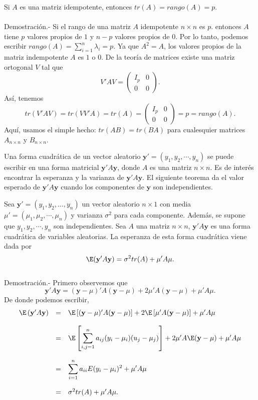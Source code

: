 \begin{teo}
    Si $A$ es una matriz idempotente, entonces $tr(A)=rango(A)=p.$\\\\
	Demostración.-\; Si el rango de una matriz $A$ idempotente $n\times n$ es $p$. entonces $A$ tiene $p$ valores propios de $1$ y $n-p$ valores propios de $0$. Por lo tanto, podemos escribir $rango(A)=\sum_{i=1}^n\lambda_i=p$. Ya que $A^2=A$, los valores propios de la matriz indempotente $A$ es $1$ o $0$. De la teoría de matrices existe una matriz ortogonal $V$ tal que
	$$
	V' A V=
	\left(
	    \begin{array}{cc}
		I_p & 0 \\
		0 & 0
	    \end{array}
	\right).
	$$
	Así, tenemos
	$$tr(V'AV)=tr(VV'A)=tr(A)= 
	\left(
	    \begin{array}{cc}
		I_p & 0 \\
		0 & 0
	    \end{array}
	\right)
	=p=rango(A).
	$$
	Aquí, usamos el simple hecho: $tr(AB)=tr(BA)$ para cualesquier matrices $A_{n\times n}$ y $B_{n\times n}$.
\end{teo}

Una forma cuadrática de un vector aleatorio $\textbf{y}' = (y_1 , y_2 , \cdots , y_n)$ se puede escribir en una forma matricial $\textbf{y}'A\textbf{y}$, donde $A$ es una matriz $n \times n$. Es de interés encontrar la esperanza y la varianza de $\textbf{y}'A\textbf{y}$. El siguiente teorema da  el valor esperado de $\textbf{y}'A\textbf{y}$ cuando los componentes de $\textbf{y}$ son independientes.

\begin{teo}
    Sea $\textbf{y}'=(y_1,y_2,\ldots,y_n)$ un vector aleatorio $n\times 1$ con media $\mu'=(\mu_1,\mu_2,\cdots,\mu_n)$ y varianza $\sigma^2$ para cada componente. Además, se supone que $y_1,y_2,\cdots,y_n$ son independientes. Sea $A$ una matriz $n\times n$, $\textbf{y}'A\textbf{y}$ es una forma cuadrática de variables aleatorias. La esperanza de esta forma cuadrática viene dada por
    $$\E(\textbf{y}'A\textbf{y})=\sigma^2tr(A)+\mu'A\mu.$$\\
	Demostración.-\; Primero observemos que
	$$\textbf{y}'A\textbf{y}=(\textbf{y}-\mu)'A(\textbf{y}-\mu)+2\mu'A(\textbf{y}-\mu)+\mu'A\mu.$$
	De donde podemos escribir,
	$$
	\begin{array}{rcl}
	    \E\left(\textbf{y}'A\textbf{y}\right) &=& \E\left[(\textbf{y}-\mu)'A(\textbf{y}-\mu)\right] + 2\E\left[\mu'A(\textbf{y}-\mu)\right]+\mu'A\mu\\\\
						  &=& \E\left[\displaystyle\sum_{i,j=1}^n a_{ij}(y_i-\mu_i)(u_j-\mu_j)\right]+2\mu'A\E(\textbf{y}-\mu)+\mu'A\mu\\\\
						  &=& \displaystyle\sum_{i=1}^n a_{ii}E(y_i-\mu_i)^2+\mu'A\mu\\\\
						  &=& \sigma^2tr(A)+\mu'A\mu.
	\end{array}
	$$
\end{teo}

